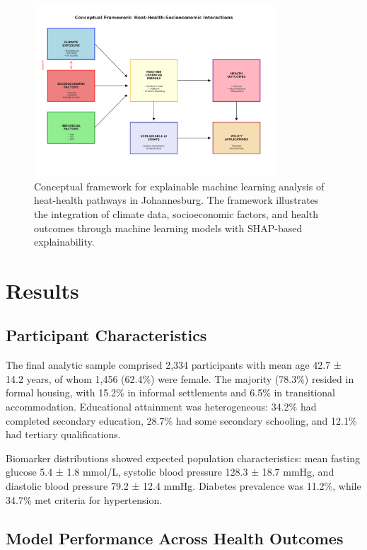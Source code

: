\documentclass[11pt,a4paper]{article}
\begin{document}
\begin{figure}[ht]
\centering
\includegraphics[width=0.8\textwidth]{heat_analysis_optimized/analysis/ConceptualFramework.png}
\caption{Conceptual framework for explainable machine learning analysis of heat-health pathways in Johannesburg. The framework illustrates the integration of climate data, socioeconomic factors, and health outcomes through machine learning models with SHAP-based explainability.}
\label{fig:conceptual}
\end{figure}

\section{Results}

\subsection{Participant Characteristics}

The final analytic sample comprised 2,334 participants with mean age 42.7 ± 14.2 years, of whom 1,456 (62.4\%) were female. The majority (78.3\%) resided in formal housing, with 15.2\% in informal settlements and 6.5\% in transitional accommodation. Educational attainment was heterogeneous: 34.2\% had completed secondary education, 28.7\% had some secondary schooling, and 12.1\% had tertiary qualifications.

Biomarker distributions showed expected population characteristics: mean fasting glucose 5.4 ± 1.8 mmol/L, systolic blood pressure 128.3 ± 18.7 mmHg, and diastolic blood pressure 79.2 ± 12.4 mmHg. Diabetes prevalence was 11.2\%, while 34.7\% met criteria for hypertension.

\subsection{Model Performance Across Health Outcomes}
\end{document}
